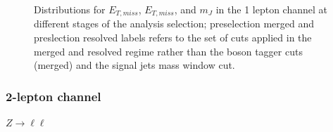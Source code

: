 \begin{figure}[ht]

	\caption{Distributions for $E_{T,miss}$, $E_{T,miss}$, and $m_{J}$ in the 1 lepton channel at different stages of the analysis selection; preselection merged and preslection resolved labels refers to the set of cuts applied in the merged and resolved regime rather than the boson tagger cuts (merged) and the signal jets mass window cut.}
	\label{fig:1LepPreselCuts}
\end{figure}

\clearpage
\subsubsection{2-lepton channel}
\label{subsubsec:2lep_event_selection}

\textbf{$Z \to \ell\ell$}

